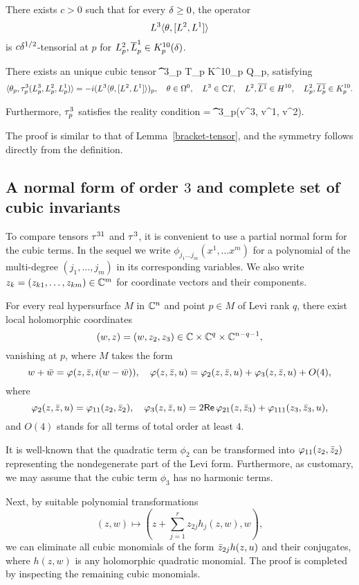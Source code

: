 \documentclass[12pt]{amsart}
\begin{document}
\bl{}
There exists $c>0$ such that for every $\delta\ge0$, the operator
$$
	L^3\langle \theta, [L^2, L^1] \rangle
$$
is $c\delta^{1/2}$-tensorial at $p$
for $L^2_p, \overline{L}^1_p \in K^{10}_p(\delta)$.

There exists an unique cubic tensor
\beq
	\t^3_p \colon \C T_p \times  K^{10}_p \times {} \to \C Q_p,
\eeq
satisfying
	$$
		\langle \theta_p, \tau^3_p(L^3_p, L^2_p, L^1_p) \rangle
		= -i (L^3\langle \theta, [L^2, L^1] \rangle)_p
		,
		\quad \theta\in \Omega^0,
		\quad L^3 \in {\mathbb{C}} T,
		\quad L^2, \overline{L^1} \in H^{10},
		\quad L^2_p, \overline{L^1_p}\in K^{10}_p.
	$$

Furthermore, $\tau^3_p$ satisfies the reality condition
\beq{}
 = \t^3_p(\1v^3, \1v^1, \1v^2).
\eeq
\el

\bpf
The proof is similar to that of Lemma~\ref{bracket-tensor},
and the symmetry follows directly from the definition.
\epf



\subsection{A normal form of order $3$ and complete set of cubic invariants}
To compare tensors $\tau^{31}$ and $\tau^3$,
it is convenient to use a partial normal form
for the cubic terms.
In the sequel we write $\phi_{j_1\ldots j_m}(x^1,\ldots x^m)$
for a polynomial of the multi-degree $(j_1,\ldots, j_m)$
in its corresponding variables.
We also write 
$z_k=(z_{k1},\ldots, z_{km})\in {\mathbb{C}}^m$
for coordinate vectors and their components.

\bp{}
For every real hypersurface $M$ in ${\mathbb{C}}^{n}$ and point $p\in M$ of Levi rank $q$, 
there exist local holomorphic coordinates 
$$
	(w,z)=(w, z_2, z_3)\in {\mathbb{C}}\times {\mathbb{C}}^q\times {\mathbb{C}}^{n-q-1},
$$ 
vanishing at $p$,
where $M$ takes the form
$$
	w + {\bar w} = \varphi(z,{\bar z}, i(w-{\bar w})), 
	\quad
	\varphi(z,{\bar z},u) = \varphi_2(z,{\bar z},u) + \varphi_3(z,{\bar z},u) + O(4), 
$$
where
$$
	\varphi_2(z,{\bar z},u) = \varphi_{11}(z_2, {\bar z}_2),
	\quad
	\varphi_3(z,{\bar z},u) = 2{\sf Re}\, \varphi_{21}(z,{\bar z}_3) + \varphi_{111}(z_3, {\bar z}_3, u),
$$
and $O(4)$ stands for all terms of total order at least $4$.
\ep


\bpf
It is well-known that the quadratic term $\phi_2$ 
can be transformed into $\varphi_{11}(z_2, {\bar z}_2)$ 
representing the nondegenerate part of the Levi form.
Furthermore, as customary, we may assume that the cubic term $\phi_3$ has no harmonic terms.

Next, by suitable polynomial transformations 
$$
	(z,w)\mapsto (z + \sum_{j=1}^r z_{2j} h_j(z,w) , w),
$$
we can eliminate all cubic monomials of the form ${\bar z}_{2j} h(z,u)$
and their conjugates, where $h(z,w)$ is any holomorphic quadratic monomial.
The proof is completed by inspecting the remaining cubic monomials.
\epf
\end{document}
